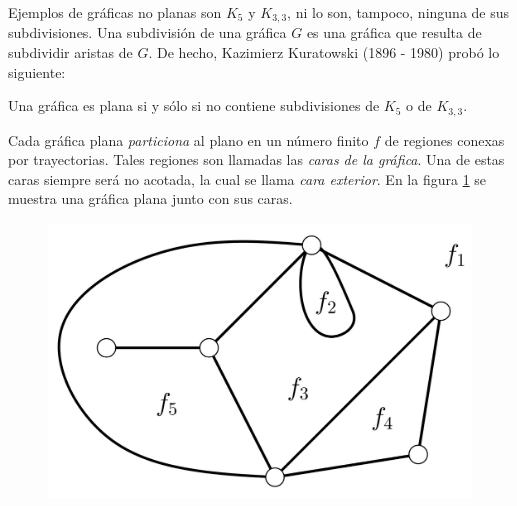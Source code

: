 Ejemplos de gráficas no planas son $K_{5}$ y $K_{3,3}$, ni lo son, tampoco, ninguna de sus subdivisiones. Una subdivisión de una gráfica $G$ es una gráfica que resulta de subdividir aristas de $G$. De hecho,  Kazimierz Kuratowski (1896 - 1980) probó lo siguiente:

\begin{teo}
Una gráfica es plana si y sólo si no contiene subdivisiones de $K_{5}$ o de $K_{3,3}$.
\end{teo}

Cada gráfica plana \textit{particiona} al plano en un número finito $f$ de regiones conexas por trayectorias. Tales regiones son llamadas las \textit{caras de la gráfica}. Una de estas caras siempre será no acotada, la cual se llama \textit{cara exterior}. En la figura \ref{fig:plana} se muestra una gráfica plana junto con sus caras.

\begin{figure}[h]
    \centering
    \includegraphics[scale=0.2]{img/imgchapter4/graficaplana.jpg}
    \caption{}
    \label{fig:plana}
\end{figure}

